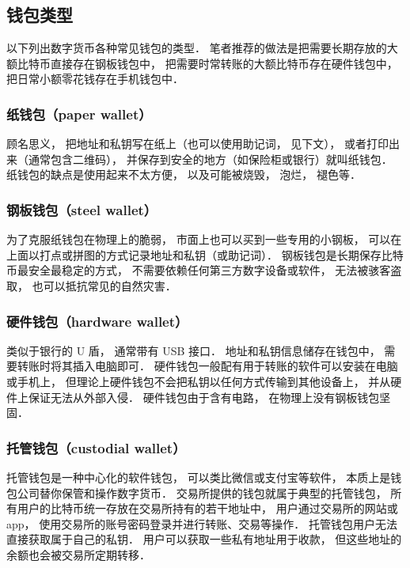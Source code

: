 \subsection{钱包类型}
以下列出数字货币各种常见钱包的类型． 笔者推荐的做法是把需要长期存放的大额比特币直接存在钢板钱包中， 把需要时常转账的大额比特币存在硬件钱包中，把日常小额零花钱存在手机钱包中．

\subsubsection{纸钱包（paper wallet）}
顾名思义， 把地址和私钥写在纸上（也可以使用助记词， 见下文）， 或者打印出来（通常包含二维码）， 并保存到安全的地方（如保险柜或银行）就叫纸钱包． 纸钱包的缺点是使用起来不太方便， 以及可能被烧毁， 泡烂， 褪色等．

\subsubsection{钢板钱包（steel wallet）}
为了克服纸钱包在物理上的脆弱， 市面上也可以买到一些专用的小钢板， 可以在上面以打点或拼图的方式记录地址和私钥（或助记词）． 钢板钱包是长期保存比特币最安全最稳定的方式， 不需要依赖任何第三方数字设备或软件， 无法被骇客盗取， 也可以抵抗常见的自然灾害．

\subsubsection{硬件钱包（hardware wallet）}
类似于银行的 U 盾， 通常带有 USB 接口． 地址和私钥信息储存在钱包中， 需要转账时将其插入电脑即可． 硬件钱包一般配有用于转账的软件可以安装在电脑或手机上， 但理论上硬件钱包不会把私钥以任何方式传输到其他设备上， 并从硬件上保证无法从外部入侵． 硬件钱包由于含有电路， 在物理上没有钢板钱包坚固．

\subsubsection{托管钱包（custodial wallet）}
托管钱包是一种中心化的软件钱包， 可以类比微信或支付宝等软件， 本质上是钱包公司替你保管和操作数字货币． 交易所提供的钱包就属于典型的托管钱包， 所有用户的比特币统一存放在交易所持有的若干地址中， 用户通过交易所的网站或 app， 使用交易所的账号密码登录并进行转账、交易等操作． 托管钱包用户无法直接获取属于自己的私钥． 用户可以获取一些私有地址用于收款， 但这些地址的余额也会被交易所定期转移．

